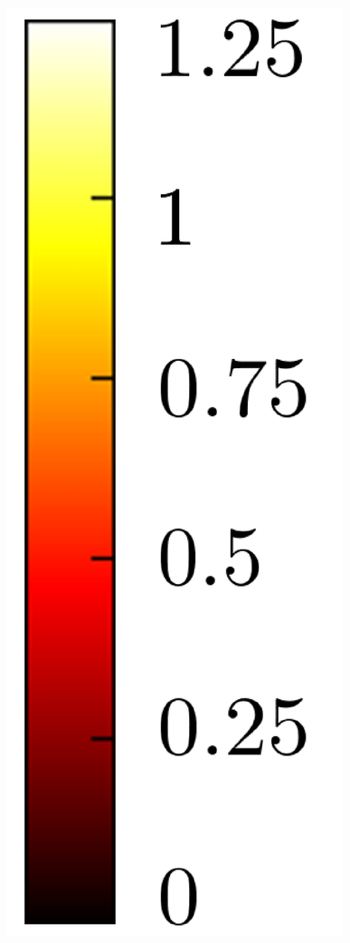 \begin{figure}[t]
\begin{center}
\begin{minipage}{0.15\hsize}
		\end{minipage}
		\begin{minipage}{0.050\hsize}
			\centerline{\includegraphics[width=\hsize]{./fig_supplement/SAM_map_color_woboundary/colorbar_hot_r1.25.eps}} %
		\end{minipage}
		

\end{center}
\end{figure}
